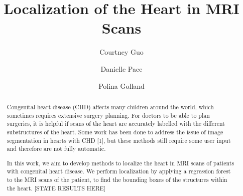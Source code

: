 \documentclass[sigconf,12pt]{acmart}
\begin{document}
\title{Localization of the Heart in MRI Scans}

\author{Courtney Guo}

\author{Danielle Pace}

\author{Polina Golland}


\begin{abstract}
\doublespacing
Congenital heart disease (CHD) affects many children around the world, which sometimes requires extensive surgery planning. For doctors to be able to plan surgeries, it is helpful if scans of the heart are accurately labelled with the different substructures of the heart. Some work has been done to address the issue of image segmentation in hearts with CHD [1], but these methods still require some user input and therefore are not fully automatic.

In this work, we aim to develop methods to localize the heart in MRI scans of patients with congenital heart disease. We perform localization by applying a regression forest to the MRI scans of the patient, to find the bounding boxes of the structures within the heart. [STATE RESULTS HERE] %
\end{abstract}


\maketitle

\begin{doublespacing}



\end{doublespacing}



\end{document}

